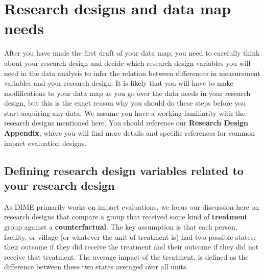 \section{Research designs and data map needs}

After you have made the first draft of your data map,
you need to carefully think about your research design
and decide which research design variables you will need in the data analysis
to infer the relation between differences in measurement variables
and your research design.
It is likely that you will have to make modifications
to your data map as you go over the data needs in your research design,
but this is the exact reason why you should do these steps
before you start acquiring any data.
We assume you have a working familiarity
with the research designs mentioned here.
You should reference our \textbf{Research Design Appendix},
where you will find more details
and specific references for common impact evaluation designs.

\subsection{Defining research design variables related to your research design}

As DIME primarily works on impact evaluations,
we focus our discussion here on research designs
that compare a group that received
some kind of \textbf{treatment}
group against a \textbf{counterfactual}.
The key assumption is that each
person, facility, or village
(or whatever the unit of treatment is)
had two possible states: their outcome if they did receive the treatment
and their outcome if they did not receive that treatment.
The average impact of the treatment,
is defined as the difference
between these two states averaged over all units.

